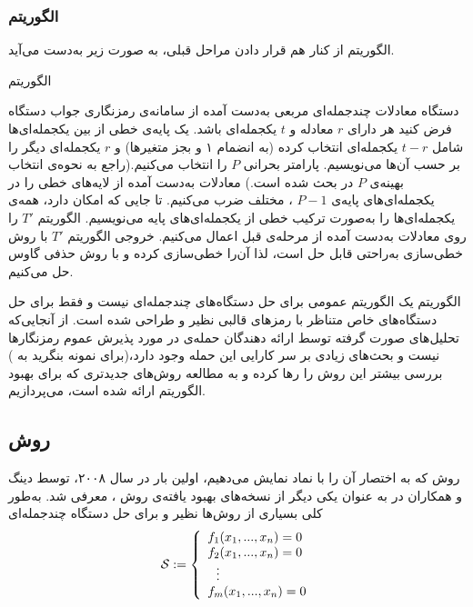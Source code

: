 \subsubsection*{الگوریتم 	}
الگوریتم 
از کنار هم قرار دادن مراحل قبلی، به صورت زیر به‌دست  می‌آید.
\renewcommand{\algorithmicrequire}{\textbf{ورودی}}
\renewcommand{\algorithmicensure}{\textbf{خروجی}}
\begin{algorithm}[H]
	\caption{الگوریتم
		}
	\label{ٓXSL alg}
	\begin{algorithmic}[1]				
		\REQUIRE دستگاه معادلات چندجمله‌ای مربعی به‌دست  آمده از سامانه‌ی رمزنگاری 
		\ENSURE جواب دستگاه 
		\STATE فرض کنید هر 
		دارای 
		$r$
		معادله و 
		$t$
		یکجمله‌ای باشد. یک پایه‌ی خطی از بین یکجمله‌ای‌ها شامل 
		$t - r$
		یکجمله‌ای انتخاب کرده (به انضمام ۱ و بجز متغیرها) و 
		$r$
		یکجمله‌ای دیگر را بر حسب آن‌ها می‌نویسیم.		
		\STATE پارامتر بحرانی 
		$P$
		را انتخاب می‌کنیم.(راجع به نحوه‌ی انتخاب بهینه‌ی 
		$P$
		در 
		\cite{courtois2002cryptanalysis}
		بحث شده است.) معادلات به‌دست  آمده از لایه‌های خطی را در یکجمله‌ای‌های پایه‌ی 
		$P - 1$
		،
		مختلف ضرب می‌کنیم. 
		\STATE تا جایی که امکان دارد، همه‌ی یکجمله‌ای‌ها را به‌صورت ترکیب خطی از یکجمله‌ای‌های پایه می‌نویسیم.
		\STATE الگوریتم 
		$T'$
		را روی معادلات به‌دست  آمده از مرحله‌ی قبل اعمال می‌کنیم.
		\STATE خروجی الگوریتم 
		$T'$
		با روش خطی‌سازی به‌راحتی قابل حل است، لذا آن‌را خطی‌سازی کرده و با روش حذفی گاوس حل می‌کنیم.
	\end{algorithmic}
\end{algorithm}
الگوریتم 
 یک الگوریتم عمومی برای حل دستگاه‌های چندجمله‌ای نیست و فقط برای حل دستگاه‌های خاص متناظر با رمزهای قالبی 
 نظیر 
 و
 طراحی شده است. از آنجایی‌که تحلیل‌های صورت گرفته توسط ارائه‌ دهندگان حمله‌ی 
 در 
 \cite{courtois2002cryptanalysis}
 مورد پذیرش عموم رمزنگارها نیست و بحث‌های زیادی بر سر کارایی این حمله وجود دارد،(برای نمونه بنگرید به 
 \cite{xiao2003applicability, murphy2003comments})
بررسی بیشتر این روش را رها کرده و به مطالعه  روش‌های  جدیدتری که برای بهبود الگوریتم 
ارائه شده است، می‌پردازیم. 
\subsection{روش 
	}
روش 
که به اختصار آن را با نماد 
نمایش می‌دهیم، اولین بار در سال ۲۰۰۸، توسط دینگ
 و همکاران در 
\cite{ding2008mutantxl}
به عنوان یکی دیگر از نسخه‌های بهبود یافته‌ی روش 
، 
معرفی شد. به‌طور کلی بسیاری از روش‌ها نظیر 
 و
برای حل دستگاه چندجمله‌ای 
\begin{equation*}
	{\mathcal S}:= \left \{ \begin{array}{l}
f_{1}(x_{1},...,x_{n}) = 0\\
f_{2}(x_{1},...,x_{n}) = 0\\
\ \ \vdots\\
f_{m}(x_{1},...,x_{n}) = 0
\end{array} \right.
\end{equation*}


